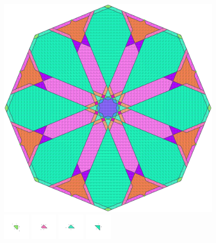 \documentclass[text.tex]{subfiles}
\begin{document}
\clearpage
\pagestyle{fancy}
\fancyhf{}
\begin{figure}[h!]
\centering
\includegraphics[width=1\textwidth]{img/results/octagon/octagon_224264_(-5_3alpha_1).pdf}
\includegraphics[width=0.12\textwidth]{img/results/octagon/octagon_224264_(-5_3alpha_1)_001.pdf}
\includegraphics[width=0.12\textwidth]{img/results/octagon/octagon_224264_(-5_3alpha_1)_002.pdf}
\includegraphics[width=0.12\textwidth]{img/results/octagon/octagon_224264_(-5_3alpha_1)_003.pdf}
\includegraphics[width=0.12\textwidth]{img/results/octagon/octagon_224264_(-5_3alpha_1)_004.pdf}

\end{figure}
\end{document}
